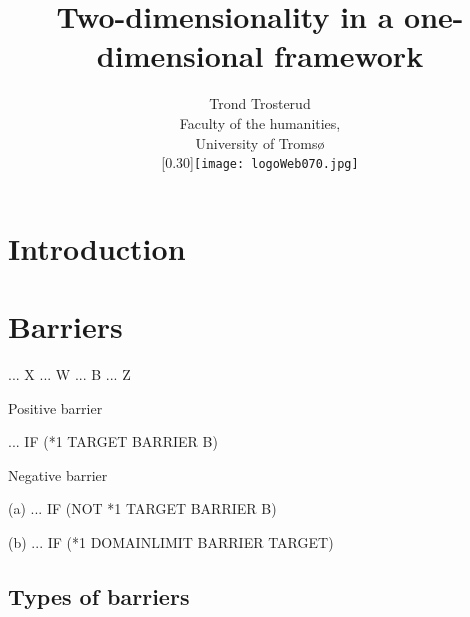 \documentclass[landscape,english,11pt]{seminar}
\begin{document}
\begin{slide}

\title{Two-dimensionality in a one-dimensional framework}
\author{Trond Trosterud\\ 
Faculty of the humanities, \\
University of Tromsø \\
\scalebox{0.30}[0.30]{\texttt{[image: logoWeb070.jpg]}}
}


\newslide
\maketitle 


\newslide
\section{Introduction}










\newslide
\section{Barriers}






\newslide
\begin{example}\label{barriers}
... X ... W ... B ... Z 
\end{example}


\newslide
\begin{example}\label{posi-barriers}
Positive barrier
\item[] ... IF (*1 TARGET BARRIER B)
\end{example}

\begin{example}\label{nega-barriers}
Negative barrier
\item[(a)] ... IF (NOT *1 TARGET BARRIER B)
\item[(b)] ... IF (*1 DOMAINLIMIT BARRIER TARGET)
\end{example}


\newslide
\subsection{Types of barriers}



\end{slide}
\end{document}
